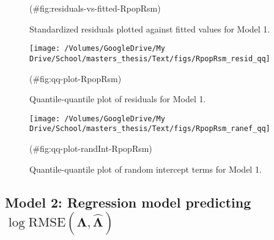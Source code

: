 \begin{appendix}
\begin{figure}
{}

\caption{Standardized residuals plotted against fitted values for Model 1.}(\#fig:residuals-vs-fitted-RpopRsm)
\end{figure}

\begin{figure}

{\centering \texttt{[image: /Volumes/GoogleDrive/My Drive/School/masters\_thesis/Text/figs/RpopRsm\_resid\_qq]} 

}

\caption{Quantile-quantile plot of residuals for Model 1.}(\#fig:qq-plot-RpopRsm)
\end{figure}

\begin{figure}

{\centering \texttt{[image: /Volumes/GoogleDrive/My Drive/School/masters\_thesis/Text/figs/RpopRsm\_ranef\_qq]} 

}

\caption{Quantile-quantile plot of random intercept terms for Model 1.}(\#fig:qq-plot-randInt-RpopRsm)
\end{figure}

\hypertarget{model-2-regression-model-predicting-log-textrmrmsemathbflambda-hatmathbflambda}{%
\subsection{\texorpdfstring{Model 2: Regression model predicting
\(\log \textrm{RMSE}(\mathbf{\Lambda}, \hat{\mathbf{\Lambda}})\)}{Model 2: Regression model predicting \textbackslash log \textbackslash textrm\{RMSE\}(\textbackslash mathbf\{\textbackslash Lambda\}, \textbackslash hat\{\textbackslash mathbf\{\textbackslash Lambda\}\})}}\label{model-2-regression-model-predicting-log-textrmrmsemathbflambda-hatmathbflambda}}


\end{appendix}

